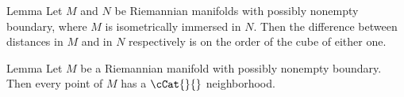 %
%
%
%
%

\begin{thm}{Lemma}\label{lem:mnflds-with-bry:CBA}
Let $M$ and $N$ be  Riemannian manifolds with possibly nonempty boundary, where $M$ is isometrically immersed in $N$.  Then the difference between distances in $M$ and in $N$ respectively is on the order of the cube of either one.
\end{thm}
%
\begin{thm}{Lemma}\label{lem:mnflds-with-bry:CBA}
Let $M$ be a Riemannian manifold with possibly nonempty boundary.
Then every point of $M$ has a $\cCat{}{}$ neighborhood.
\end{thm}

